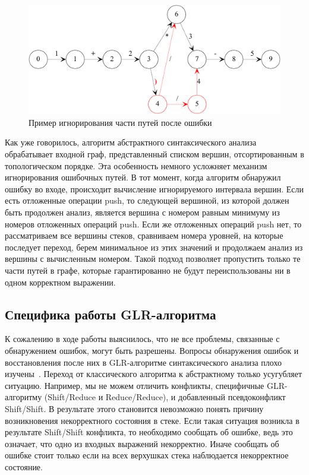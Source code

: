 \begin{figure}[h]
 \label{ignor}
 \centering
 \includegraphics[width=\linewidth]{Verbitskaia/IgnoringPaths.pdf}
 \caption{Пример игнорирования части путей после ошибки}
 \label{ignor}
\end{figure}

Как уже говорилось, алгоритм абстрактного синтаксического анализа обрабатывает 
входной граф, представленный списком вершин, отсортированным в топологическом 
порядке. Эта особенность немного усложняет механизм игнорирования ошибочных путей. 
В тот момент, когда алгоритм обнаружил ошибку во входе, происходит вычисление 
игнорируемого интервала вершин. Если есть отложенные операции push, то следующей 
вершиной, из которой должен быть продолжен анализ, является вершина с номером 
равным минимуму из номеров отложенных операций push. Если же отложенных операций 
push нет, то рассматриваем все вершины стеков, сравниваем номера уровней, на 
которые последует переход, берем минимальное из этих значений и продолжаем анализ 
из вершины с вычисленным номером. Такой подход позволяет пропустить только те 
части путей в графе, которые гарантированно не будут переиспользованы ни в одном 
корректном выражении. 

\subsection{Специфика работы GLR-алгоритма}
К сожалению в ходе работы выяснилось, что не все проблемы, связанные с обнаружением 
ошибок, могут быть разрешены. Вопросы обнаружения ошибок и восстановления после 
них в GLR-алгоритме синтаксического анализа плохо изучены~\cite{economopoulos2006generalised}. Переход от классического 
алгоритма к абстрактному только усугубляет ситуацию. Например, мы не можем отличить 
конфликты, специфичные GLR-алгоритму (Shift/Reduce и Reduce/Reduce), и добавленный 
псевдоконфликт Shift/Shift. В результате этого становится невозможно понять причину 
возникновения некорректного состояния в стеке. Если такая ситуация возникла в 
результате Shift/Shift конфликта, то необходимо сообщать об ошибке, ведь это 
означает, что одно из входных выражений некорректно. Иначе сообщать об ошибке 
стоит только если на всех верхушках стека наблюдается некорректное состояние. 

